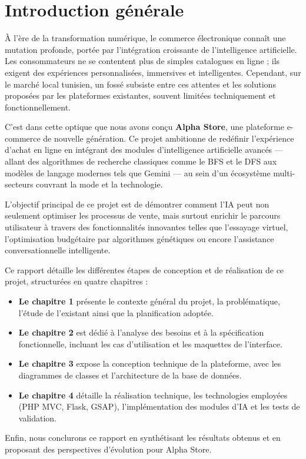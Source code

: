 \chapter*{Introduction générale}
\label{chap:introduction}

À l'ère de la transformation numérique, le commerce électronique connaît une mutation profonde, portée par l'intégration croissante de l'intelligence artificielle. Les consommateurs ne se contentent plus de simples catalogues en ligne ; ils exigent des expériences personnalisées, immersives et intelligentes. Cependant, sur le marché local tunisien, un fossé subsiste entre ces attentes et les solutions proposées par les plateformes existantes, souvent limitées techniquement et fonctionnellement.

C’est dans cette optique que nous avons conçu \textbf{Alpha Store}, une plateforme e-commerce de nouvelle génération. Ce projet ambitionne de redéfinir l'expérience d'achat en ligne en intégrant des modules d'intelligence artificielle avancés — allant des algorithmes de recherche classiques comme le BFS et le DFS aux modèles de langage modernes tels que Gemini — au sein d'un écosystème multi-secteurs couvrant la mode et la technologie.

L’objectif principal de ce projet est de démontrer comment l'IA peut non seulement optimiser les processus de vente, mais surtout enrichir le parcours utilisateur à travers des fonctionnalités innovantes telles que l'essayage virtuel, l'optimisation budgétaire par algorithmes génétiques ou encore l'assistance conversationnelle intelligente.

Ce rapport détaille les différentes étapes de conception et de réalisation de ce projet, structurées en quatre chapitres :

\begin{itemize}[label=$\bullet$]
    \item \textbf{Le chapitre 1} présente le contexte général du projet, la problématique, l'étude de l'existant ainsi que la planification adoptée.
    \item \textbf{Le chapitre 2} est dédié à l'analyse des besoins et à la spécification fonctionnelle, incluant les cas d'utilisation et les maquettes de l'interface.
    \item \textbf{Le chapitre 3} expose la conception technique de la plateforme, avec les diagrammes de classes et l'architecture de la base de données.
    \item \textbf{Le chapitre 4} détaille la réalisation technique, les technologies employées (PHP MVC, Flask, GSAP), l'implémentation des modules d'IA et les tests de validation.
\end{itemize}

Enfin, nous conclurons ce rapport en synthétisant les résultats obtenus et en proposant des perspectives d'évolution pour Alpha Store.
